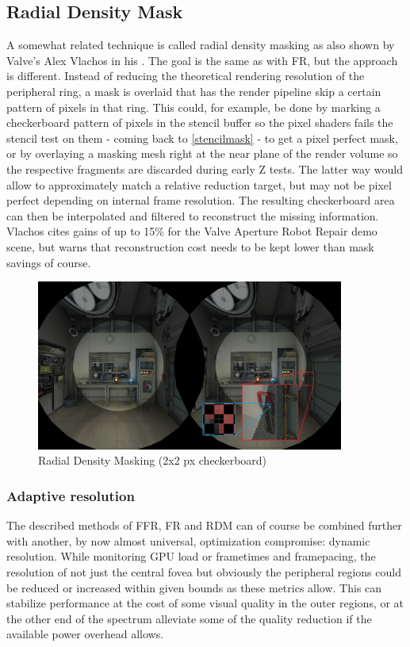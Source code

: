 \subsection{Radial Density Mask}
A somewhat related technique is called radial density masking as also shown by Valve's Alex Vlachos in his \cite{Vlachos.2016c}. The goal is the same as with FR, but the approach is different. Instead of reducing the theoretical rendering resolution of the peripheral ring, a mask is overlaid that has the render pipeline skip a certain pattern of pixels in that ring. This could, for example, be done by marking a checkerboard pattern of pixels in the stencil buffer so the pixel shaders fails the stencil test on them - coming back to \autoref{stencilmask} - to get a pixel perfect mask, or by overlaying a masking mesh right at the near plane of the render volume so the respective fragments are discarded during early Z tests. The latter way would allow to approximately match a relative reduction target, but may not be pixel perfect depending on internal frame resolution. 
The resulting checkerboard area can then be interpolated and filtered to reconstruct the missing information. 
Vlachos cites gains of up to 15\% for the Valve Aperture Robot Repair demo scene, but warns that reconstruction cost needs to be kept lower than mask savings of course. \\

\begin{figure}[!htb]
  \centering
  \includegraphics[width=0.9\textwidth]{pictures/vlachos_RDM}
  \caption{Radial Density Masking (2x2 px checkerboard)\cite{Vlachos.2016c}} \label{fig:vlachos_RDM}
\end{figure} 

\subsubsection{Adaptive resolution}
The described methods of FFR, FR and RDM can of course be combined further with another, by now almost universal, optimization compromise: dynamic resolution. While monitoring GPU load or frametimes and framepacing, the resolution of not just the central fovea but obviously the peripheral regions could be reduced or increased within given bounds as these metrics allow. This can stabilize performance at the cost of some visual quality in the outer regions, or at the other end of the spectrum alleviate some of the quality reduction if the available power overhead allows. 


